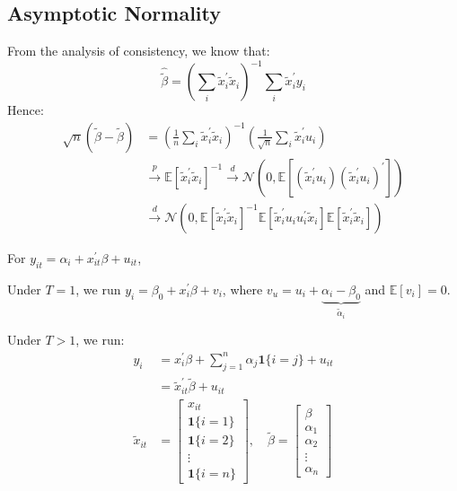 \subsection{Asymptotic Normality}

From the analysis of consistency, we know that:
\[ 
\hat{\tilde{\beta}} = \left(\sum_i \tilde{x}_i^{\prime} \tilde{x}_i \right)^{-1} \sum_i \tilde{x}_i^{\prime} y_i
\]
Hence:
\begin{align*}
    \sqrt{n} (\hat{\tilde{\beta}} - \tilde{\beta}) &= \left(\frac{1}{n} \sum_i \tilde{x}_i^{\prime} \tilde{x}_i \right)^{-1} \left(\frac{1}{\sqrt{n} } \sum_i \tilde{x}_i^{\prime} u_i \right) \\
    & \overset{p}{\rightarrow}\mathbb{E}[\tilde{x}_i^{\prime} \tilde{x}_i]^{-1} \overset{d}{\rightarrow} \mathcal{N}\left(0, \mathbb{E}\left[\left(\tilde{x}_i^{\prime} u_i\right) \left(\tilde{x}_i^{\prime} u_i\right)^{\prime} \right] \right)\\
    & \overset{d}{\rightarrow} \mathcal{N} \left(0, \mathbb{E}\left[\tilde{x}_i^{\prime} \tilde{x}_i \right]^{-1} \mathbb{E}\left[\tilde{x}_i^{\prime} u_i u_i^{\prime} \tilde{x}_i \right] \mathbb{E}\left[\tilde{x}_i^{\prime} \tilde{x}_i \right] \right)
\end{align*}

For $y_{it} = \alpha_i + x_{it}^{\prime} \beta + u_{it} $,

Under $T=1$, we run $y_i = \beta_0 + x_i^{\prime} \beta + v_i$, 
where $v_u = u_i + \underset{\tilde{\alpha}_i}{\underbrace{\alpha_i - \beta_0}}$
and $\mathbb{E}[v_i] = 0$.

Under $T>1$, we run:
\begin{align*}
    y_i &= x_i^{\prime} \beta  + \sum_{j=1}^{n} \alpha_j \mathbf{1}\{i=j\} + u_{it} \\
    &= \tilde{x}_{it}^{\prime} \tilde{\beta} + u_{it} \\
    \tilde{x}_{it} &= \begin{bmatrix}
      x_{it} \\
      \mathbf{1}\{i=1\} \\
      \mathbf{1}\{i=2\} \\
      \vdots \\
      \mathbf{1}\{i=n\}
    \end{bmatrix}, \quad
    \tilde{\beta} = \begin{bmatrix}
      \beta \\
      \alpha_1 \\
      \alpha_2 \\
      \vdots \\
      \alpha_n
    \end{bmatrix}
\end{align*}
